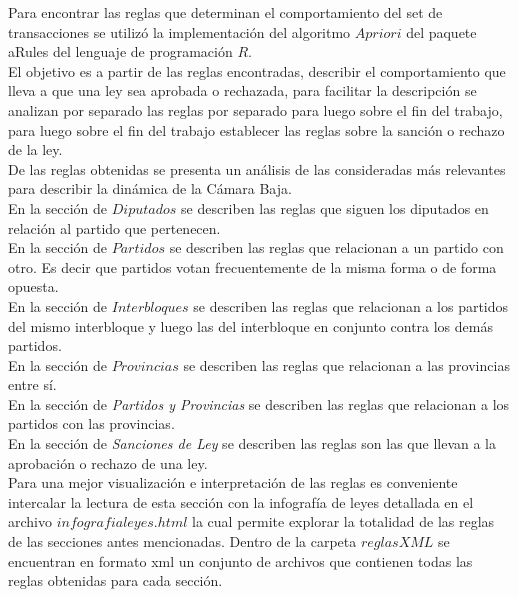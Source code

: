 \documentclass{endm}
\begin{document}
Para encontrar las reglas que determinan el comportamiento del set de transacciones se utilizó la implementación del algoritmo $Apriori$ del paquete aRules del lenguaje de programación $R$.\\

El objetivo es a partir de las reglas encontradas, describir el comportamiento que lleva a que una ley sea aprobada o rechazada, para facilitar la descripción se analizan por separado las reglas por separado para luego sobre el fin del trabajo, para luego sobre el fin del trabajo establecer las reglas sobre la sanción o rechazo de la ley.\\

De las reglas obtenidas se presenta un análisis de las consideradas más relevantes para describir la dinámica de la Cámara Baja. \\

En la sección de $Diputados$ se describen las reglas que siguen los diputados en relación al partido que pertenecen.\\

En la sección de $Partidos$ se describen las reglas que relacionan a un partido con otro. Es decir que partidos votan frecuentemente de la misma forma o de forma opuesta.\\

En la sección de $Interbloques$ se describen las reglas que relacionan a los partidos del mismo interbloque y luego las del interbloque en conjunto contra los demás partidos.\\

En la sección de $Provincias$ se describen las reglas que relacionan a las provincias entre sí.\\

En la sección de \textit{Partidos y Provincias} se describen las reglas que relacionan a los partidos con las provincias.\\

En la sección de \textit{Sanciones de Ley} se describen las reglas son las que llevan a la aprobación o rechazo de una ley.\\

Para una mejor visualización e interpretación de las reglas es conveniente intercalar la lectura de esta sección con la infografía de leyes detallada en el archivo \textbf{$infografia leyes.html$} la cual permite explorar la totalidad de las reglas de las secciones antes mencionadas. Dentro de la carpeta \textbf{$reglas XML$} se encuentran en formato xml un conjunto de archivos que contienen todas las reglas obtenidas para cada sección.\\
\end{document}
